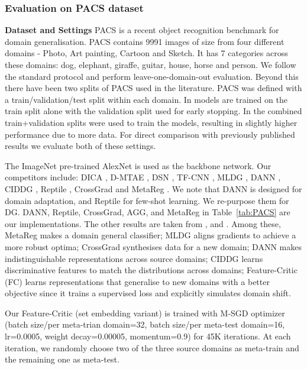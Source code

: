 \documentclass{article}
\newcommand{\modelname}{Feature-Critic}
\newcommand{\keypoint}[1]{\vspace{0.0cm}\noindent\textbf{#1}\quad}
\begin{document}
\subsubsection{Evaluation on PACS dataset}
\keypoint{Dataset and Settings} PACS \cite{Lida17} is a recent object recognition benchmark for domain generalisation. PACS contains 9991 images of size  from four different domains - Photo, Art painting, Cartoon and Sketch. It has 7 categories across these domains: dog, elephant, giraffe, guitar, house, horse and person. We follow the standard protocol and perform leave-one-domain-out evaluation. Beyond this there have been two splits of PACS used in the literature.  PACS was defined with a train/validation/test split within each domain. In \citet{Li18} models are trained on the train split alone with the validation split used for early stopping. In \citet{Balaji18} the combined train+validation splits were used to train the models, resulting in slightly higher performance due to more data. For direct comparison with previously published results we evaluate both of these settings.

The ImageNet pre-trained AlexNet \cite{Krizhevsky12} is used as the backbone network. Our competitors include: DICA \cite{Muandet13}, D-MTAE \cite{Ghifary15}, DSN \cite{Bousmalis16}, TF-CNN \cite{Lida17}, MLDG \cite{Li18}, DANN \cite{Ganin16}, CIDDG \cite{LiY18conditional}, Reptile \cite{nichol2018reptileFOML}, CrossGrad \cite{Shankar18} and MetaReg \cite{Balaji18}. We note that DANN is designed for domain adaptation, and Reptile for few-shot learning. We re-purpose them for DG. DANN, Reptile,  CrossGrad, AGG, and MetaReg in Table~\ref{tab:PACS} are our implementations. The other results are taken from \citet{Li18}, \citet{LiY18conditional} and \citet{Balaji18}. Among these, MetaReg makes a domain general classifier; MLDG aligns gradients to achieve a more robust optima; CrossGrad synthesises data for a new domain; DANN makes indistinguishable representations across source domains; CIDDG learns discriminative features to match the distributions across domains; \modelname{} (FC) learns representations that generalise to new domains with a better objective since it trains a supervised loss and explicitly simulates domain shift.

Our \modelname{} (set embedding variant) is trained with M-SGD optimizer (batch size/per meta-trian domain=32, batch size/per meta-test domain=16, lr=0.0005, weight decay=0.00005, momentum=0.9) for 45K iterations. At each iteration, we randomly choose two of the three source domains as meta-train and the remaining one as meta-test.
 
\end{document}

